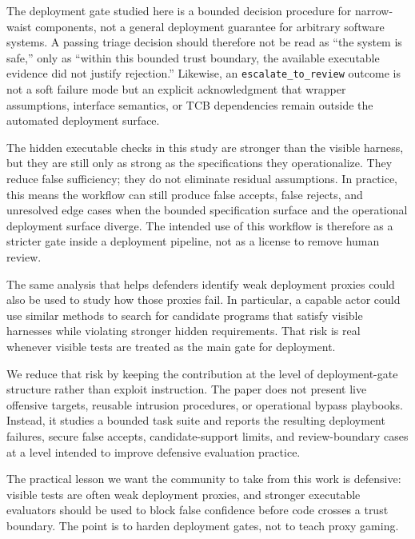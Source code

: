 \documentclass[11pt]{article}
\newcommand{\subsectiongray}[1]{%
  \vspace{2.5ex plus 0.5ex}%
  \noindent{\normalfont\large\color{gray}#1}%
  \vspace{0.6ex}\par\noindent%
}
\begin{document}
\subsectiongray{Interpretation Boundaries}

The deployment gate studied here is a bounded decision procedure for narrow-waist components, not a general deployment guarantee for arbitrary software systems. A passing triage decision should therefore not be read as ``the system is safe,'' only as ``within this bounded trust boundary, the available executable evidence did not justify rejection.'' Likewise, an \texttt{escalate\_to\_review} outcome is not a soft failure mode but an explicit acknowledgment that wrapper assumptions, interface semantics, or TCB dependencies remain outside the automated deployment surface.

The hidden executable checks in this study are stronger than the visible harness, but they are still only as strong as the specifications they operationalize. They reduce false sufficiency; they do not eliminate residual assumptions. In practice, this means the workflow can still produce false accepts, false rejects, and unresolved edge cases when the bounded specification surface and the operational deployment surface diverge. The intended use of this workflow is therefore as a stricter gate inside a deployment pipeline, not as a license to remove human review.

\subsectiongray{Dual-Use Considerations}

The same analysis that helps defenders identify weak deployment proxies could also be used to study how those proxies fail. In particular, a capable actor could use similar methods to search for candidate programs that satisfy visible harnesses while violating stronger hidden requirements. That risk is real whenever visible tests are treated as the main gate for deployment.

We reduce that risk by keeping the contribution at the level of deployment-gate structure rather than exploit instruction. The paper does not present live offensive targets, reusable intrusion procedures, or operational bypass playbooks. Instead, it studies a bounded task suite and reports the resulting deployment failures, secure false accepts, candidate-support limits, and review-boundary cases at a level intended to improve defensive evaluation practice.

The practical lesson we want the community to take from this work is defensive: visible tests are often weak deployment proxies, and stronger executable evaluators should be used to block false confidence before code crosses a trust boundary. The point is to harden deployment gates, not to teach proxy gaming.
\end{document}
